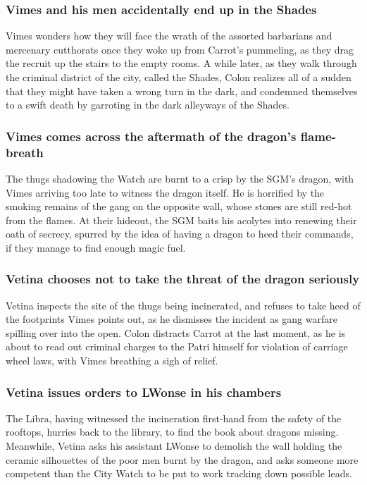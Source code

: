 \subsubsection{\Gls{Vimes} and his men accidentally end up in the Shades}
\Gls{Vimes} wonders how they will face the wrath of the assorted barbarians and mercenary cutthorats
once they woke up from \Gls{Carrot}'s pummeling, as they drag the recruit up the stairs to the
empty rooms. A while later, as they walk through the criminal district of the city, called the
Shades, \Gls{Colon} realizes all of a sudden that they might have taken a wrong turn in the dark,
and condemned themselves to a swift death by garroting in the dark alleyways of the Shades.

\subsubsection{\Gls{Vimes} comes across the aftermath of the dragon's flame-breath}
The thugs shadowing the Watch are burnt to a crisp by the \Gls{SGM}'s dragon, with \Gls{Vimes}
arriving too late to witness the dragon itself. He is horrified by the smoking remains of the gang
on the opposite wall, whose stones are still red-hot from the flames. At their hideout, the
\Gls{SGM} baits his acolytes into renewing their oath of secrecy, spurred by the idea of having a
dragon to heed their commands, if they manage to find enough magic fuel.

\subsubsection{\Gls{Vetina} chooses not to take the threat of the dragon seriously}
\Gls{Vetina} inspects the site of the thugs being incinerated, and refuses to take heed of the
footprints \Gls{Vimes} points out, as he dismisses the incident as gang warfare spilling over into
the open. \Gls{Colon} distracts \Gls{Carrot} at the last moment, as he is about to read out criminal
charges to the \Gls{Patri} himself for violation of carriage wheel laws, with \Gls{Vimes} breathing
a sigh of relief.

\subsubsection{\Gls{Vetina} issues orders to \Gls{LWonse} in his chambers}
The \Gls{Libra}, having witnessed the incineration first-hand from the safety of the rooftops,
hurries back to the library, to find the book about dragons missing. Meanwhile, \Gls{Vetina} asks
his assistant \Gls{LWonse} to demolish the wall holding the ceramic silhouettes of the poor men
burnt by the dragon, and asks someone more competent than the City Watch to be put to work tracking
down possible leads.

